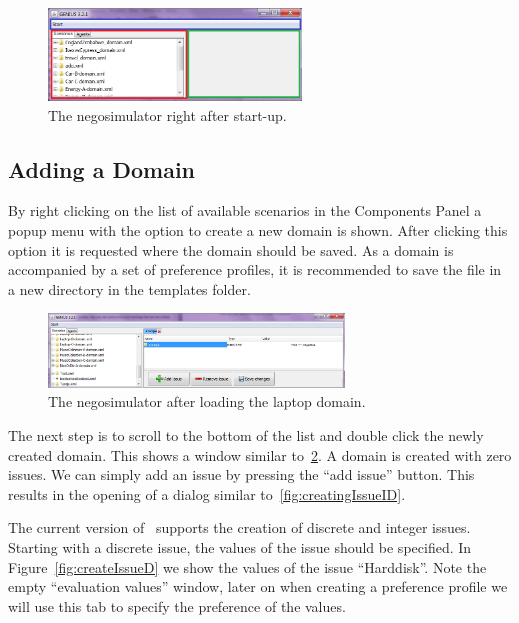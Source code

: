 \documentclass[]{article}
\begin{document}
\begin{figure}[htb]
	\centering
	\includegraphics[width=0.6\textwidth]{media/image6.png}
\caption{The negosimulator right after start-up.}\label{Fig:negosimulator start}
\end{figure}

\subsection{Adding a Domain}
By right clicking on the list of available scenarios in the Components Panel a popup menu with the option to create a new domain is shown. After clicking this option it is requested where the domain should be saved. As a domain is accompanied by a set of preference profiles, it is recommended to save the file in a new directory in the templates folder.

\begin{figure}[htb]
	\centering
	\includegraphics[width=0.7\textwidth]{media/image7.png}
\caption{The negosimulator after loading the laptop domain.}\label{Fig:newdomain}
\end{figure}

The next step is to scroll to the bottom of the list and double click the newly created domain. This shows a window similar to~\ref{Fig:newdomain}. A domain is created with zero issues. We can simply add an issue by pressing the ``add issue'' button. This results in the opening of a dialog similar to~\ref{fig:creatingIssueID}.

The current version of \Genius~supports the creation of discrete and integer issues. Starting with a discrete issue, the values of the issue should be specified. In Figure~\ref{fig:createIssueD} we show the values of the issue ``Harddisk''. Note the empty ``evaluation values'' window, later on when creating a preference profile we will use this tab to specify the preference of the values.
\end{document}
